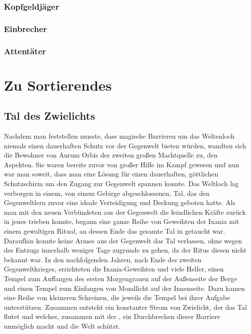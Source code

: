 \documentclass[a4paper,12pt,oneside]{book}
\begin{document}
\section{Kopfgeldjäger}
\section{Einbrecher}
\section{Attentäter}
\newpage

\part{Zu Sortierendes}

\chapter{Tal des Zwielichts}\label{Tal des Zwielicht}
Nachdem man feststellen musste, dass magische Barrieren um das Weltenloch niemals einen dauerhaften Schutz vor der Gegenwelt bieten würden, wandten sich die Bewohner von Aurum Orbis der zweiten großen Machtquelle zu, den Aspekten. Sie waren bereits zuvor von großer Hilfe im Kampf gewesen und nun war man soweit, dass man eine Lösung für einen dauerhaften, göttlichen Schutzschirm um den Zugang zur Gegenwelt spannen konnte. Das Weltloch lag verborgen in einem, von einem Gebirge abgeschlossenen, Tal, das den Gegenweltlern zuvor eine ideale Verteidigung und Deckung geboten hatte. Als man mit den neuen Verbündeten aus der Gegenwelt die feindlichen Kräfte zurück in jenes trieben konnte, begann eine ganze Reihe von Geweihten der Ixania mit einem gewaltigen Ritual, an dessen Ende das gesamte Tal in \uline{} getaucht war. Daraufhin konnte keine Armee aus der Gegenwelt das Tal verlassen, ohne wegen des Entzugs innerhalb weniger Tage zugrunde zu gehen, da der Ritus diesen nicht bekannt war. In den nachfolgenden Jahren, nach Ende des zweiten Gegenweltkrieges, errichteten die Ixania-Geweihten und viele Helfer, einen Tempel zum Auffangen des ersten Morgengrauen auf der Außenseite der Berge und einen Tempel zum Einfangen von Mondlicht auf der Innenseite. Dazu kamen eine Reihe von kleineren Schreinen, die jeweils die Tempel bei ihrer Aufgabe unterstützen. Zusammen entsteht ein konstanter Strom von Zwielicht, der das Tal flutet und welches, zusammen mit der \uline{}, ein Durchbrechen dieser Barriere unmöglich macht und die Welt schützt.
\end{document}
